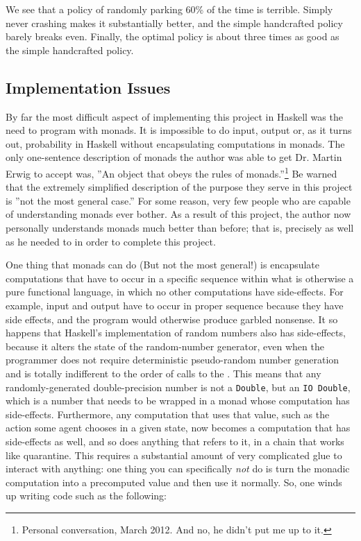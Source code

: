 \documentclass[paper=letter,pagesize=automedia,twoside=false,12pt]{scrartcl}
\DeclareRobustCommand{\abbrev}[1]{{\addfontfeature{Letters=UppercaseSmallCaps}{#1}}}
\theoremstyle{plain}%
\theoremstyle{definition}
\theoremstyle{remark}
\providecommand{\abbrev}[1]{{\scshape {#1}}}
\begin{document}
We see that a policy of randomly parking 60\% of the time is terrible.  Simply never crashing makes it substantially better, and the simple handcrafted policy barely breaks even.  Finally, the optimal policy is about three times as good as the simple handcrafted policy.

\subsection{Implementation Issues}\label{sec:simimp}
By far the most difficult aspect of implementing this project in Haskell was the need to program with monads.  It is impossible to do input, output or, as it turns out, probability in Haskell without encapsulating computations in monads.  The only one-sentence description of monads the author was able to get Dr. Martin Erwig to accept was, ”An object that obeys the rules of monads.”\footnote{Personal conversation, March 2012.  And no, he didn’t put me up to it.}  Be warned that the extremely simplified description of the purpose they serve in this project is ”not the most general case.”  For some reason, very few people who are capable of understanding monads ever bother.  As a result of this project, the author now personally understands monads much better than before; that is, precisely as well as he needed to in order to complete this project.

One thing that monads can do (But not the most general!) is encapsulate computations that have to occur in a specific sequence within what is otherwise a pure functional language, in which no other computations have side-effects.  For example, input and output have to occur in proper sequence because they have side effects, and the program would otherwise produce garbled nonsense.  It so happens that Haskell’s implementation of random numbers also has side-effects, because it alters the state of the random-number generator, even when the programmer does not require deterministic pseudo-random number generation and is totally indifferent to the order of calls to the \abbrev{RNG}.  This means that any randomly-generated double-precision number is not a \texttt{Double}, but an \texttt{IO Double}, which is a number that needs to be wrapped in a monad whose computation has side-effects.  Furthermore, any computation that uses that value, such as the action some agent chooses in a given state, now becomes a computation that has side-effects as well, and so does anything that refers to it, in a chain that works like quarantine.  This requires a substantial amount of very complicated glue to interact with anything: one thing you can specifically \emph{not} do is turn the monadic computation into a precomputed value and then use it normally.  So, one winds up writing code such as the following:
\end{document}
